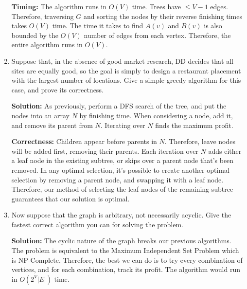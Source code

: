\documentclass[12pt]{article}
\begin{document}
\begin{enumerate}[label=\textbf{\arabic*}]
	\par{\textbf{Timing:} The algorithm runs in $O(V)$ time. Trees have $\leq V - 1$ edges. Therefore, traversing $G$ and sorting the nodes by their reverse finishing times takes $O(V)$ time. The time it takes to find $A(v)$ and $B(v)$ is also bounded by the $O(V)$ number of edges from each vertex. Therefore, the entire algorithm runs in $O(V)$.}
	\item Suppose that, in the absence of good market research, DD decides that all sites are equally good, so the goal is simply to design a restaurant placement with the largest number of locations. Give a simple greedy algorithm for this case, and prove its correctness. \\
	\par{\textbf{Solution:} As previously, perform a DFS search of the tree, and put the nodes into an array $N$ by finishing time. When considering a node, add it, and remove its parent from $N$. Iterating over $N$ finds the maximum profit.}
	\par{\textbf{Correctness:} Children appear before parents in $N$. Therefore, leave nodes will be added first, removing their parents. Each iteration over $N$ adds either a leaf node in the existing subtree, or skips over a parent node that's been removed. In any optimal selection, it's possible to create another optimal selection by removing a parent node, and swapping it with a leaf node. Therefore, our method of selecting the leaf nodes of the remaining subtree guarantees that our solution is optimal.}
	\item Now suppose that the graph is arbitrary, not necessarily acyclic. Give the fastest correct algorithm you can for solving the problem. 
	\par{\textbf{Solution:} The cyclic nature of the graph breaks our previous algorithms. The problem is equivalent to the Maximum Independent Set Problem which is NP-Complete. Therefore, the best we can do is to try every combination of vertices, and for each combination, track its profit. The algorithm would run in $O(2^V|E|)$ time.}
\end{enumerate}
\end{document}
